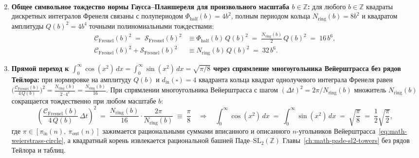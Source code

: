 \begin{theorem}
\begin{enumerate}[label=\textbf{(\arabic*)},leftmargin=*]
\begin{align}
  \end{align}
\item \textbf{Общее символьное тождество нормы Гаусса--Планшереля для произвольного масштаба $b \in \mathbb{Z}$:}
  для любого $b \in \mathbb{Z}$ квадраты дискретных интегралов Френеля связаны с полупериодом $\Phi_{\mathrm{half}}(b) = 4b^2$, полным периодом кольца $N_{\mathrm{ring}}(b) = 8b^2$ и квадратом амплитуды $Q(b)^2 = 4b^4$ точными полиномиальными тождествами:
  \begin{align}
    \mathcal{C}_{\mathrm{Fresnel}}(b)^2 \;=\; \mathcal{S}_{\mathrm{Fresnel}}(b)^2 &\equiv \Phi_{\mathrm{half}}(b)\,Q(b)^2 \;=\; \frac{N_{\mathrm{ring}}(b)}{2}\,Q(b)^2 \;=\; 16\,b^6, \label{eq:math-fresnel-halfperiod-norm} \\
    \mathcal{C}_{\mathrm{Fresnel}}(b)^2 + \mathcal{S}_{\mathrm{Fresnel}}(b)^2 &\equiv N_{\mathrm{ring}}(b)\,Q(b)^2 \;=\; 32\,b^6. \label{eq:math-fresnel-plancherel-norm}
  \end{align}
\item \textbf{Прямой переход к $\int_0^\infty \cos(x^2)\,dx = \int_0^\infty \sin(x^2)\,dx = \sqrt{\pi/8}$ через спрямление многоугольника Вейерштрасса без рядов Тейлора:}
  при нормировке на амплитуду $Q(b)$ и $d_{\mathrm{in}}(\square) = 4$ квадранта кольца квадрат однолучевого интеграла Френеля равен $\bigl(\frac{\mathcal{C}_{\mathrm{Fresnel}}(b)}{4\,Q(b)}\bigr)^2 = \frac{N_{\mathrm{ring}}(b)}{2\cdot 4^2} = \frac{N_{\mathrm{ring}}(b)}{16}$. При спрямлении многоугольника Вейерштрасса с шагом $(\Delta t)^2 = 2\pi / N_{\mathrm{ring}}(b)$ множитель $N_{\mathrm{ring}}(b)$ сокращается тождественно при любом масштабе $b$:
  \begin{equation}
    \label{eq:math-fresnel-pi-over-8}
    \left(\frac{\mathcal{C}_{\mathrm{Fresnel}}(b)}{4\,Q(b)}\,\Delta t\right)^2
    \;=\; \frac{N_{\mathrm{ring}}(b)}{16}\cdot\frac{2\pi}{N_{\mathrm{ring}}(b)}
    \;\equiv\; \frac{\pi}{8}
    \quad\Longrightarrow\quad
    \int_0^\infty \cos(x^2)\,dx \;=\; \int_0^\infty \sin(x^2)\,dx \;=\; \sqrt{\frac{\pi}{8}} \;=\; \frac{1}{2}\sqrt{\frac{\pi}{2}},
  \end{equation}
  где $\pi \in [\pi_{\mathrm{in}}(n),\ \pi_{\mathrm{out}}(n)]$ зажимается рациональными суммами вписанного и описанного $n$-угольников Вейерштрасса~\eqref{eq:math-weierstrass-circle}, а квадратный корень извлекается рациональной башней Паде--$\mathrm{SL}_2(\mathbb{Z})$ Главы~\ref{ch:math-pade-sl2-towers} без рядов Тейлора и таблиц.
\end{enumerate}
\end{theorem}

